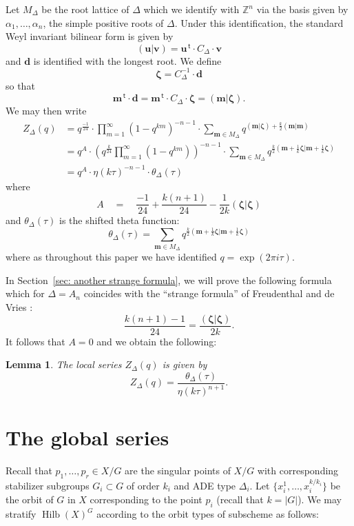 \documentclass{article}
\newtheorem{lemma}[theorem]{Lemma}
\theoremstyle{definition}
\newcommand{\ZZ} {{\mathbb Z}}		%
\renewcommand{\top}{\,\mathsf{t}}
\newcommand{\mvec}{\bm{m}}
\newcommand{\zetavec}{\bm{\zeta }}
\newcommand{\dvec}{\bm{d }}
\newcommand{\uvec}{\bm{u }}
\newcommand{\vvec}{\bm{v }}
\newcommand{\Hilb}{\operatorname{Hilb}}
\begin{document}
Let $M_{\Delta}$ be the root lattice of $\Delta$ which we identify
with $\ZZ^{n}$ via the basis given by $\alpha_{1},\dotsc ,\alpha_{n}$,
the simple positive roots of $\Delta$. Under this identification, the
standard Weyl invariant bilinear form is given by
\[
(\uvec |\vvec ) = \uvec^{\top}\cdot C_{\Delta}\cdot \vvec 
\]
and $\dvec$ is identified with the longest root. 
We define
\[
\zetavec = C_{\Delta}^{-1} \cdot \dvec 
\]
so that 
\[
\mvec^{\top}\cdot \dvec = \mvec^{\top}\cdot C_{\Delta} \cdot \zetavec
= (\mvec |\zetavec ).
\]
We may then write
\begin{align*}
Z_{\Delta}(q)& = q^{\frac{-1}{24}}\cdot
\prod_{m=1}^{\infty}(1-q^{km})^{-n-1}\cdot \sum _{\mvec \in M_{\Delta}} q^{(\mvec |\zetavec )+\frac{k}{2}(\mvec |\mvec)}\\
&= q^{A} \cdot \left(q^{\frac{k}{24}}\prod_{m=1}^{\infty}(1-q^{km})
\right)^{-n-1} \cdot \sum_{\mvec \in M_{\Delta}} q^{\frac{k}{2}\left(\mvec +\frac{1}{k}\zetavec |\mvec +\frac{1}{k}\zetavec  \right)}\\
& = q^{A}\cdot  \eta (k\tau )^{-n-1}\cdot  \theta_{\Delta} (\tau )
\end{align*}
where 
\[
A \quad = \quad \frac{-1}{24} + \frac{k(n+1)}{24} - \frac{1}{2k}(\zetavec
|\zetavec )
\]
and $\theta_{\Delta}(\tau )$ is the shifted theta function:
\[
\theta_{\Delta}(\tau ) = \sum_{\mvec \in M_{\Delta}} q^{\frac{k}{2}\left(\mvec +\frac{1}{k}\zetavec |\mvec +\frac{1}{k}\zetavec  \right)}
\]
where as throughout this paper we have identified $q=\exp\left(2\pi i\tau  \right)$.

In Section~\ref{sec: another strange formula}, we will prove the
following formula which for $\Delta =A_{n}$ coincides with the
``strange formula'' of Freudenthal and de Vries
\cite{freudenthal1969linear}:
\[
 \frac{k(n+1)-1}{24}  = \frac{(\zetavec |\zetavec )}{2k}.
\]
It follows that $A=0$ and we obtain the following:
\begin{lemma}\label{lem: local series as theta/eta} The local series
$Z_{\Delta}(q)$ is given by
\[
Z_{\Delta}(q) = \frac{\theta_{\Delta}(\tau )}{\eta (k\tau )^{n+1}}. 
\]
\end{lemma}


\section{The global series}\label{sec: the global series}

Recall that $p_{1},\dotsc ,p_{r}\in X/G$ are the singular points of
$X/G$ with corresponding stabilizer subgroups $G_{i}\subset G$ of
order $k_{i}$ and ADE type $\Delta_{i}$. Let $\{x_{i}^{1},\dotsc
,x_{i}^{k/k_{i}} \}$ be the orbit of $G$ in $X$ corresponding to the
point $p_{i}$ (recall that $k=|G|$).  We may stratify $\Hilb (X)^{G}$
according to the orbit types of subscheme as follows:
\end{document}
